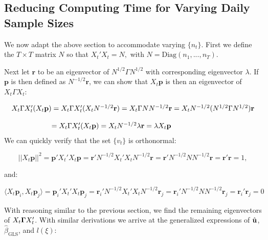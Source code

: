 \subsection{Reducing Computing Time for Varying Daily Sample Sizes}

We now adapt the above section to accommodate varying $\{n_t\}$. First we define the $T\times T$ matrix $N$ so that $X_t'X_t = N,$ with $N = \text{Diag}(n_1,...,n_T)$. 

Next let $\mathbf{r}$ to be an eigenvector of $N^{1/2}\Gamma N^{1/2}$ with corresponding eigenvector $\lambda$. If $\mathbf{p}$ is then defined as $N^{-1/2}\mathbf{r}$, we can show that $X_t\mathbf{p}$ is then an eigenvector of $X_t\Gamma X_t$:


\begin{equation}
    \begin{array}{cc}
   X_t \Gamma X_t'(X_t\mathbf{p}) & \hspace{-.1in} = X_t \Gamma X_t'(X_tN^{-1/2}\mathbf{\mathbf{r}}) = X_t \Gamma NN^{-1/2}\mathbf{r} = X_t N^{-1/2} (N^{1/2} \Gamma N^{1/2})\mathbf{r}  \\
    & \\
     & \hspace{-1.75in} = X_t \Gamma X_t'(X_t\mathbf{p}) = X_t N^{-1/2} \lambda \mathbf{r} = \lambda X_t\mathbf{p}
\end{array} 
\end{equation} 
We can quickly verify that the set $\{v_t\}$ is orthonormal:

$$||X_t\mathbf{p}||^2 = \mathbf{p}'X_t'X_t\mathbf{p} = \mathbf{r}'N^{-1/2}X_t'X_tN^{-1/2}\mathbf{r} = \mathbf{r}' N^{-1/2} N N^{-1/2} \mathbf{r} = \mathbf{r}'\mathbf{r} = 1, $$

and:

$$ \langle X_t\mathbf{p}_i, X_t\mathbf{p}_j\rangle = \mathbf{p}_i'X_t'X_t\mathbf{p}_j = \mathbf{r}_i'N^{-1/2}X_t'X_tN^{-1/2}\mathbf{r}_j = \mathbf{r}_i' N^{-1/2} N N^{-1/2} \mathbf{r}_j = \mathbf{r}_i'\mathbf{r}_j = 0 $$

With reasoning similar to the previous section, we find the remaining eigenvectors of $X_t\mathbf{\Gamma} X_t'$. With similar derivations we arrive at the generalized expressions of $\hat{\mathbf{u}}$, $\hat{\beta}_{\text{GLS}}$, and $l(\xi)$:



